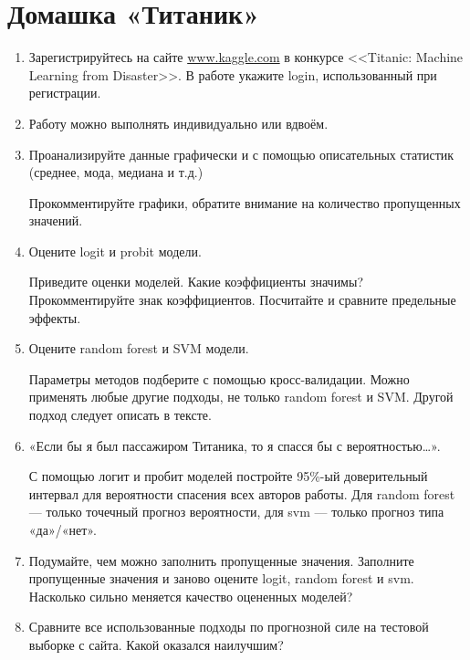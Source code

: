 \documentclass[a4paper]{article}
\begin{document}
\pagestyle{empty}
\section*{Домашка «Титаник»}



\begin{enumerate}

\item Зарегистрируйтесь на сайте \url{www.kaggle.com}  в конкурсе <<Titanic: Machine Learning from Disaster>>. В работе укажите login, использованный при регистрации.

\item Работу можно выполнять индивидуально или вдвоём.

\item Проанализируйте данные графически и с помощью описательных статистик (среднее, мода, медиана и т.д.)

Прокомментируйте графики, обратите внимание на количество пропущенных значений.

\item Оцените logit и probit модели.

Приведите оценки моделей. Какие коэффициенты значимы? Прокомментируйте знак коэффициентов. Посчитайте и сравните предельные эффекты.

\item Оцените random forest и SVM модели.

Параметры методов подберите с помощью кросс-валидации. Можно применять любые другие подходы, не только random forest и SVM. Другой подход следует описать в тексте.


\item «Если бы я был пассажиром Титаника, то я спасся бы с вероятностью\ldots».

С помощью логит и пробит моделей постройте 95\%-ый доверительный интервал для вероятности спасения всех авторов работы. Для random forest --- только точечный прогноз вероятности, для svm --- только прогноз типа «да»/«нет».


\item Подумайте, чем можно заполнить пропущенные значения. Заполните пропущенные значения и заново оцените logit, random forest и svm. Насколько сильно меняется качество оцененных моделей?


\item Сравните все использованные подходы по прогнозной силе на тестовой выборке с сайта. Какой оказался наилучшим?


\end{enumerate}
\end{document}
